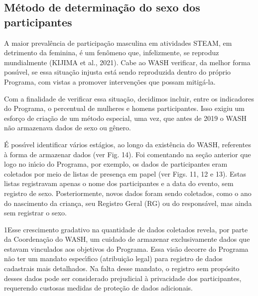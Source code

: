\documentclass[
12pt,		%
openright,	%
twoside,  %
a4paper,			%
chapter=TITLE,		%
english,			%
french,				%
spanish,			%
brazil				%
]{USPSC-classe/USPSC}
\begin{document}
\subsection[M\'etodo de determina\c{c}\~ao do sexo dos participantes]{M\'etodo de determina\c{c}\~ao do sexo dos participantes}\label{M\'etodo de determina\c{c}\~ao do sexo dos participantes}
A maior preval\^encia de participa\c{c}\~ao masculina em atividades STEAM, em detrimento da feminina, \'e um fen\^omeno que, infelizmente, se reproduz mundialmente (KIJIMA et al., 2021). Cabe ao WASH verificar, da melhor forma poss\'{\i}vel, se essa situa\c{c}\~ao injusta est\'a sendo reproduzida dentro do pr\'oprio Programa, com vistas a promover interven\c{c}\~oes que possam mitig\'a-la.









Com a finalidade de verificar essa situa\c{c}\~ao, decidimos incluir, entre os indicadores do Programa, o percentual de mulheres e homens participantes. Isso exigiu um esfor\c{c}o de cria\c{c}\~ao de um m\'etodo especial, uma vez, que antes de 2019 o WASH n\~ao armazenava dados de sexo ou g\^enero.









\'E poss\'{\i}vel identificar v\'arios est\'agios, ao longo da exist\^encia do WASH, referentes \`a forma de armazenar dados (ver Fig. 14). Foi comentando na se\c{c}\~ao anterior que logo no in\'{\i}cio do Programa, por exemplo, os dados de participantes eram coletados por meio de listas de presen\c{c}a em papel (ver Figs. 11, 12 e 13). Estas listas registravam apenas o nome dos participantes e a data do evento, sem registro de sexo. Posteriormente, novos dados foram sendo coletados, como o ano do nascimento da crian\c{c}a, seu Registro Geral (RG) ou do respons\'avel, mas ainda sem registrar o sexo.









1Esse crescimento gradativo na quantidade de dados coletados revela, por parte da Coordena\c{c}\~ao do WASH, um cuidado de armazenar exclusivamente dados que estavam vinculados aos objetivos do Programa. Essa vis\~ao decorre do Programa n\~ao ter um mandato espec\'{\i}fico (atribui\c{c}\~ao legal) para registro de dados cadastrais mais detalhados. Na falta desse mandato, o registro sem prop\'osito desses dados pode ser considerado prejudicial \`a privacidade dos participantes, requerendo custosas medidas de prote\c{c}\~ao de dados adicionais.
\end{document}
